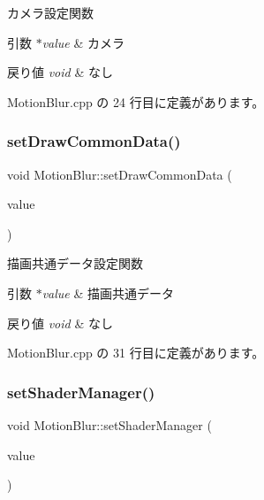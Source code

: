 カメラ設定関数 


\begin{DoxyParams}{引数}
{\em $\ast$value} & カメラ \\
\hline
\end{DoxyParams}

\begin{DoxyRetVals}{戻り値}
{\em void} & なし \\
\hline
\end{DoxyRetVals}


 Motion\+Blur.\+cpp の 24 行目に定義があります。

\mbox{\label{class_motion_blur_ac33ebb6a66254418212786178f4e4479}} 
\subsubsection{\texorpdfstring{set\+Draw\+Common\+Data()}{setDrawCommonData()}}
{\footnotesize\ttfamily void Motion\+Blur\+::set\+Draw\+Common\+Data (\begin{DoxyParamCaption}\item[{\mbox{\hyperlink{class_draw_common_data}{Draw\+Common\+Data}} $\ast$}]{value }\end{DoxyParamCaption})}



描画共通データ設定関数 


\begin{DoxyParams}{引数}
{\em $\ast$value} & 描画共通データ \\
\hline
\end{DoxyParams}

\begin{DoxyRetVals}{戻り値}
{\em void} & なし \\
\hline
\end{DoxyRetVals}


 Motion\+Blur.\+cpp の 31 行目に定義があります。

\mbox{\label{class_motion_blur_a801a9afbb4ee439af84bbaa2050cd414}} 
\subsubsection{\texorpdfstring{set\+Shader\+Manager()}{setShaderManager()}}
{\footnotesize\ttfamily void Motion\+Blur\+::set\+Shader\+Manager (\begin{DoxyParamCaption}\item[{\mbox{\hyperlink{class_shader_manager}{Shader\+Manager}} $\ast$}]{value }\end{DoxyParamCaption})}



